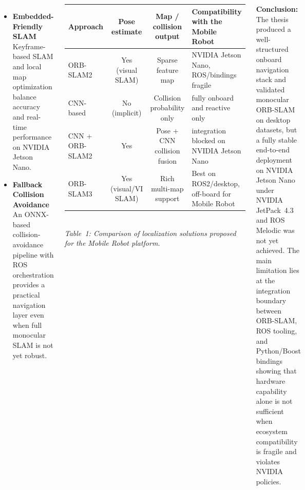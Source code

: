 \documentclass[25pt,a0paper, portrait]{tikzposter}
\begin{document}
\begin{columns}
{{\begin{itemize}
					\item \textbf{Embedded-Friendly SLAM}\\
					Keyframe-based SLAM and local map optimization balance accuracy and real-time performance on NVIDIA Jetson Nano.
					
					\item \textbf{Fallback Collision Avoidance}\\
					An ONNX-based collision-avoidance pipeline with ROS orchestration provides a practical navigation layer even when full monocular SLAM is not yet robust.
				\end{itemize}
				
				\vspace{0.1em}
				\begin{center}
					{\small
						\renewcommand{\arraystretch}{1.5}
						\begin{tabular}{lccp{12.7cm}}
							\toprule
							\textbf{Approach} & \textbf{Pose estimate} & \textbf{Map / collision output} & \textbf{Compatibility with the Mobile Robot} \\
							\midrule
							ORB-SLAM2 & Yes (visual SLAM) & Sparse feature map & NVIDIA Jetson Nano, ROS/bindings fragile \\
							CNN-based & No (implicit) & Collision probability only & fully onboard and reactive only \\
							CNN + ORB-SLAM2 & Yes & Pose + CNN collision fusion & integration blocked on NVIDIA Jetson Nano \\
							ORB-SLAM3 & Yes (visual/VI SLAM) & Rich multi-map support & Best on ROS2/desktop, off-board for Mobile Robot \\
							\bottomrule
					\end{tabular}}\\
					\vspace{0.3cm}
					{\small \textit{Table~1: Comparison of localization solutions proposed for the Mobile Robot platform.}}
				\end{center}
			

				\textbf{Conclusion:}\\
				The thesis produced a well-structured onboard navigation stack and validated monocular ORB-SLAM on desktop datasets, but a fully stable end-to-end deployment on NVIDIA Jetson Nano under NVIDIA JetPack~4.3 and ROS Melodic was not yet achieved. The main limitation lies at the integration boundary between ORB-SLAM, ROS tooling, and Python/Boost bindings showing that hardware capability alone is not sufficient when ecosystem compatibility is fragile and violates NVIDIA policies.
				
}}
\end{columns}
\end{document}
